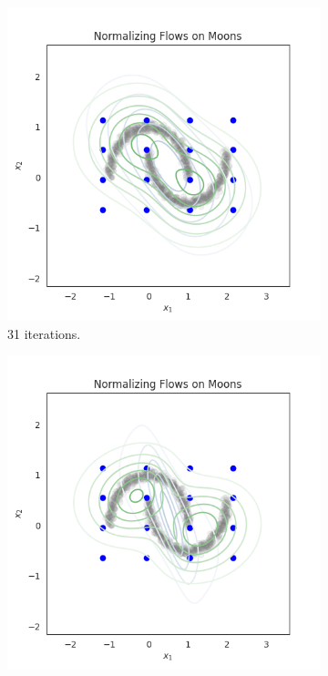 \documentclass[shortabstract]{iithesis}
\begin{document}
\begin{figure}
    \begin{subfigure}{0.32\textwidth}
    \includegraphics[scale=0.35]{flow_on_moons_3_penalty=0_grid.png}
    \caption{ 31 iterations.}
    \end{subfigure}
    \begin{subfigure}{0.32\textwidth}
    \includegraphics[scale=0.35]{flow_on_moons_4_penalty=0_grid.png}

\end{subfigure}
\end{figure}
\end{document}
